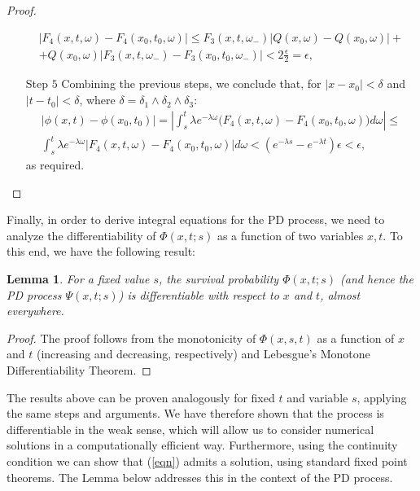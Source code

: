 \documentclass[11pt,reqno]{article}
\newtheorem{lemma}[theorem]{Lemma}
\theoremstyle{definition}
\begin{document}
\begin{proof}
\begin{itemize}
		\begin{eqnarray}
			|F_4(x,t,\omega)-F_4(x_0,t_0,\omega)| \leq F_3(x,t,\omega_-)|Q(x,\omega)-Q(x_0,\omega)| +\nonumber\\ +Q(x_0,\omega)|F_3(x,t,\omega_-)-F_3(x_0,t_0,\omega_-)| < 2\frac{\epsilon}{2}=\epsilon,
		\end{eqnarray} 
		
		\item[Step $5$] Combining the previous steps, we conclude that, for $|x-x_0|<\delta$ and $|t-t_0| < \delta$, where $\delta=\delta_1 \wedge \delta_2 \wedge \delta_3$:
		\begin{eqnarray}
			|\phi(x,t)-\phi(x_0,t_0)| = |\int_{s}^{t} \lambda e^{-\lambda \omega} \big( F_4(x,t,\omega)-F_4(x_0,t_0,\omega)\big)d\omega| \leq \nonumber \\ 
			\int_{s}^{t} \lambda e^{-\lambda \omega}|F_4(x,t,\omega)-F_4(x_0,t_0,\omega)| d\omega < (e^{-\lambda s}-e^{-\lambda t})\epsilon < \epsilon,
		\end{eqnarray}
		as required.
	\end{itemize}
\end{proof}

Finally, in order to derive integral equations for the PD process, we need to analyze the differentiability of $\Phi(x,t;s)$ as a function of two variables $x,t$. To this end, we have the following result:

\begin{lemma}\label{diff}
	For a fixed value $s$, the survival probability $\Phi(x,t;s)$ (and hence the PD process $\Psi(x,t;s)$) is differentiable with respect to $x$ and $t$, almost everywhere. %
\end{lemma}

\begin{proof}
	The proof follows from the monotonicity of $\Phi(x,s,t)$ as a function of $x$ and $t$ (increasing and decreasing, respectively) and Lebesgue's Monotone Differentiability Theorem.
\end{proof}


The results above can be proven analogously for fixed $t$ and variable $s$, applying the same steps and arguments. We have therefore shown that the process is differentiable in the weak sense, which will allow us to consider numerical solutions in a computationally efficient way. Furthermore, using the continuity condition we can show that (\ref{eqn}) admits a solution, using standard fixed point theorems. The Lemma below addresses this in the context of the PD process.
\end{document}

